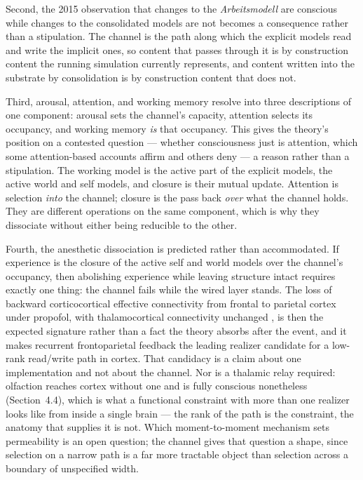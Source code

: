 \documentclass[12pt]{article}
\begin{document}
Second, the 2015 observation that changes to the \emph{Arbeitsmodell} are conscious while changes to the consolidated models are not becomes a consequence rather than a stipulation. The channel is the path along which the explicit models read and write the implicit ones, so content that passes through it is by construction content the running simulation currently represents, and content written into the substrate by consolidation is by construction content that does not.

Third, arousal, attention, and working memory resolve into three descriptions of one component: arousal sets the channel's capacity, attention selects its occupancy, and working memory \emph{is} that occupancy. This gives the theory's position on a contested question --- whether consciousness just is attention, which some attention-based accounts affirm and others deny --- a reason rather than a stipulation. The working model is the active part of the explicit models, the active world and self models, and closure is their mutual update. Attention is selection \emph{into} the channel; closure is the pass back \emph{over} what the channel holds. They are different operations on the same component, which is why they dissociate without either being reducible to the other.

Fourth, the anesthetic dissociation is predicted rather than accommodated. If experience is the closure of the active self and world models over the channel's occupancy, then abolishing experience while leaving structure intact requires exactly one thing: the channel fails while the wired layer stands. The loss of backward corticocortical effective connectivity from frontal to parietal cortex under propofol, with thalamocortical connectivity unchanged \citep{Boly2012}, is then the expected signature rather than a fact the theory absorbs after the event, and it makes recurrent frontoparietal feedback the leading realizer candidate for a low-rank read/write path in cortex. That candidacy is a claim about one implementation and not about the channel. Nor is a thalamic relay required: olfaction reaches cortex without one and is fully conscious nonetheless (Section~4.4), which is what a functional constraint with more than one realizer looks like from inside a single brain --- the rank of the path is the constraint, the anatomy that supplies it is not. Which moment-to-moment mechanism sets permeability is an open question; the channel gives that question a shape, since selection on a narrow path is a far more tractable object than selection across a boundary of unspecified width.
\end{document}
